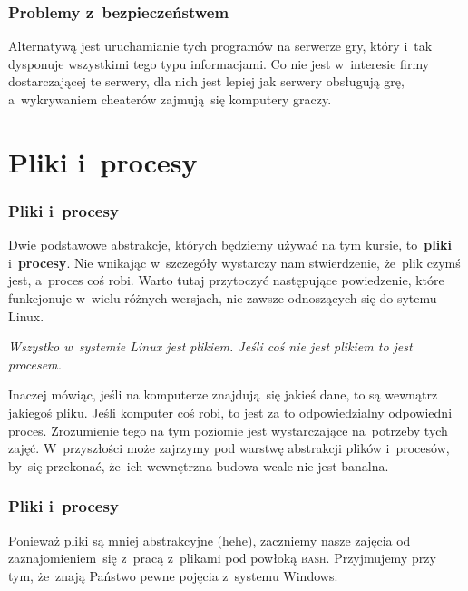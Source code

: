 \documentclass[10pt,t]{beamer}
\begin{document}
\begin{frame}
  \frametitle{Problemy z~bezpieczeństwem}


  Alternatywą jest uruchamianie tych programów na serwerze
  gry, który i~tak dysponuje wszystkimi tego typu informacjami. Co nie jest
  w~interesie firmy dostarczającej te serwery, dla nich jest lepiej jak
  serwery obsługują grę, a~wykrywaniem cheaterów zajmują~się komputery
  graczy.

\end{frame}










\section{Pliki i~procesy}



\begin{frame}
  \frametitle{Pliki i~procesy}


  Dwie podstawowe abstrakcje, których będziemy używać na tym kursie,
  to~\textbf{pliki} i~\textbf{procesy}. Nie wnikając w~szczegóły wystarczy
  nam stwierdzenie, że~plik czymś jest, a~proces coś robi. Warto tutaj
  przytoczyć następujące powiedzenie, które funkcjonuje w~wielu różnych
  wersjach, nie zawsze odnoszących się do sytemu Linux.

  \textit{Wszystko w~systemie Linux jest plikiem. Jeśli coś nie jest
    plikiem to jest procesem.}

  Inaczej mówiąc, jeśli na komputerze znajdują~się jakieś dane, to są
  wewnątrz jakiegoś pliku. Jeśli komputer coś robi, to jest za to
  odpowiedzialny odpowiedni proces. Zrozumienie tego na tym poziomie jest
  wystarczające na~potrzeby tych zajęć. W~przyszłości może zajrzymy pod
  warstwę abstrakcji plików i~procesów, by~się przekonać, że~ich wewnętrzna
  budowa wcale nie jest banalna.

\end{frame}





\begin{frame}
  \frametitle{Pliki i~procesy}


  Ponieważ pliki są mniej abstrakcyjne (hehe), zaczniemy nasze zajęcia od
  zaznajomieniem~się z~pracą z~plikami pod powłoką \textsc{bash}.
  Przyjmujemy przy tym, że~znają Państwo pewne pojęcia z~systemu Windows.

\end{frame}
\end{document}
